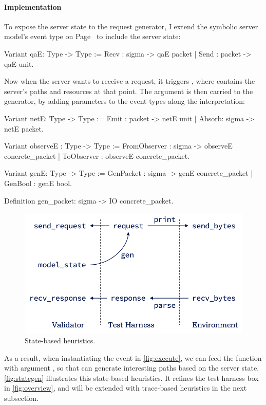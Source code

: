 \paragraph{Implementation}
To expose the server state to the request generator, I extend the symbolic
server model's  event type on Page~\pageref{def:symbolic-qae} to
include the server state:

\begin{minipage}{\linewidth}
\begin{coq}
  Variant qaE: Type -> Type :=
    Recv : sigma      -> qaE packet
  | Send : packet -> qaE unit.
\end{coq}
\end{minipage}

\vspace*{1em}
Now when the server wants to receive a request, it triggers ,
where  contains the server's paths and resources at that
point.  The  argument is then carried to the generator, by adding
parameters to the event types along the interpretation:
\begin{coq}
  Variant netE: Type -> Type :=
    Emit  : packet -> netE unit
  | Absorb: sigma      -> netE packet.

  Variant observeE : Type -> Type :=
    FromObserver   : sigma -> observeE concrete_packet
  | ToObserver     : observeE concrete_packet.

  Variant genE: Type -> Type :=
    GenPacket : sigma -> genE concrete_packet
  | GenBool   : genE bool.

  Definition gen_packet: sigma -> IO concrete_packet.
\end{coq}

\begin{figure}
\includegraphics[width=.6\linewidth]{figures/stategen}
\caption{State-based heuristics.}
\label{fig:stategen}
\end{figure}

As a result, when instantiating the  event in
\autoref{fig:execute}, we can feed the  function with argument
, so that  can generate interesting paths based on the
server state.  \autoref{fig:stategen} illustrates this state-based heuristics.
It refines the test harness box in \autoref{fig:overview}, and will be extended
with trace-based heuristics in the next subsection.

